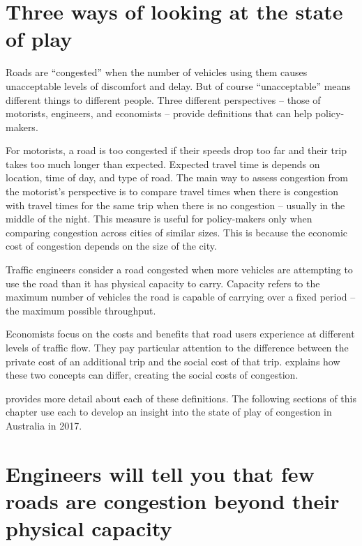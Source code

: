 \section{Three ways of looking at the state of play}


Roads are “congested” when the number of vehicles using them causes unacceptable levels of discomfort and delay. But of course “unacceptable” means different things to different people. Three different perspectives – those of motorists, engineers, and economists – provide definitions that can help policy-makers. 

For motorists, a road is too congested if their speeds drop too far and their trip takes too much longer than expected. Expected travel time is depends on location, time of day, and type of road. The main way to assess congestion from the motorist's perspective is to compare travel times when there is congestion with travel times for the same trip when there is no congestion – usually in the middle of the night. This measure is useful for policy-makers only when comparing congestion across cities of similar sizes. This is because the economic cost of congestion depends on the size of the city.

Traffic engineers consider a road congested when more vehicles are attempting to use the road than it has physical capacity to carry. Capacity refers to the maximum number of vehicles the road is capable of carrying over a fixed period – the maximum possible throughput.

Economists focus on the costs and benefits that road users experience at different levels of traffic flow. They pay particular attention to the difference between the private cost of an additional trip and the social cost of that trip.  explains how these two concepts can differ, creating the social costs of congestion. 

 provides more detail about each of these definitions. The following sections of this chapter use each to develop an insight into the state of play of congestion in Australia in 2017. 





\section{Engineers will tell you that few roads are congestion beyond their physical capacity}\label{subsec:quantifying-capacity}

